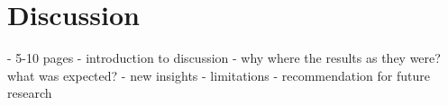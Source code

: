\chapter{Discussion}

- 5-10 pages
- introduction to discussion
- why where the results as they were? what was expected?
- new insights
- limitations
- recommendation for future research

